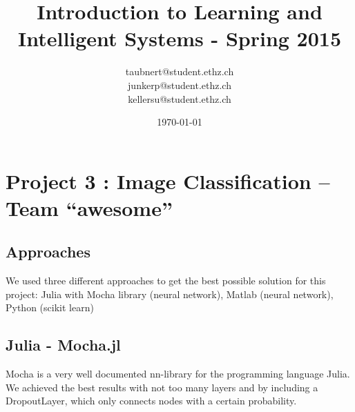 \documentclass[a4paper, 11pt]{article}
\title{Introduction to Learning and Intelligent Systems - Spring 2015}
\author{taubnert@student.ethz.ch\\ junkerp@student.ethz.ch\\ kellersu@student.ethz.ch\\}
\date{\today}
\begin{document}
\maketitle

\section*{Project 3 : Image Classification -- Team ``awesome''}

\subsection{Approaches}
We used three different approaches to get the best possible solution for this project: Julia with Mocha library
(neural network), Matlab (neural network), Python (scikit learn)



\subsection{Julia - Mocha.jl}
Mocha is a very well documented nn-library for the programming language Julia. We achieved the best results with not
too many layers and by including a DropoutLayer, which only connects nodes with a certain probability.
\end{document}
